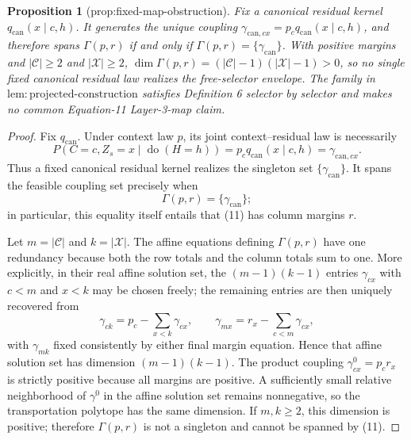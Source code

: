 \documentclass{article}
\newtheorem{proposition}{Proposition}
\begin{document}
\begin{proposition}[prop:fixed-map-obstruction]\label{prop:fixed-map-obstruction}
Fix a canonical residual kernel \(q_{\mathrm{can}}(x\mid c,h)\). It generates the unique coupling \(\gamma_{\mathrm{can},cx}=p_cq_{\mathrm{can}}(x\mid c,h)\), and therefore spans \(\Gamma(p,r)\) if and only if \(\Gamma(p,r)=\{\gamma_{\mathrm{can}}\}\). With positive margins and \(|\mathcal C|\ge2\) and \(|\mathcal X|\ge2\), \(\operatorname{dim}\Gamma(p,r)=(|\mathcal C|-1)(|\mathcal X|-1)>0\), so no single fixed canonical residual law realizes the free-selector envelope. The family in \(\mathrm{lem:projected\text{-}construction}\) satisfies Definition 6 selector by selector and makes no common Equation-11 Layer-3-map claim.
\end{proposition}
\begin{proof}
Fix \(q_{\mathrm{can}}\).  Under context law \(p\), its joint context--residual law is necessarily
\[
P(C=c,Z_s=x\mid\operatorname{do}(H=h))
=p_cq_{\mathrm{can}}(x\mid c,h)
=\gamma_{\mathrm{can},cx}.
\tag{11}
\]
Thus a fixed canonical residual kernel realizes the singleton set \(\{\gamma_{\mathrm{can}}\}\).  It spans the feasible coupling set precisely when
\[
\Gamma(p,r)=\{\gamma_{\mathrm{can}}\};
\]
in particular, this equality itself entails that (11) has column margins \(r\).

Let \(m=|\mathcal C|\) and \(k=|\mathcal X|\).  The affine equations defining \(\Gamma(p,r)\) have one redundancy because both the row totals and the column totals sum to one.  More explicitly, in their real affine solution set, the \((m-1)(k-1)\) entries \(\gamma_{cx}\) with \(c<m\) and \(x<k\) may be chosen freely; the remaining entries are then uniquely recovered from
\[
\gamma_{c k}=p_c-\sum_{x<k}\gamma_{cx},
\qquad
\gamma_{m x}=r_x-\sum_{c<m}\gamma_{cx},
\]
with \(\gamma_{mk}\) fixed consistently by either final margin equation.  Hence that affine solution set has dimension \((m-1)(k-1)\).  The product coupling \(\gamma^0_{cx}=p_cr_x\) is strictly positive because all margins are positive.  A sufficiently small relative neighborhood of \(\gamma^0\) in the affine solution set remains nonnegative, so the transportation polytope has the same dimension.  If \(m,k\geq2\), this dimension is positive; therefore \(\Gamma(p,r)\) is not a singleton and cannot be spanned by (11).


\end{proof}
\end{document}
